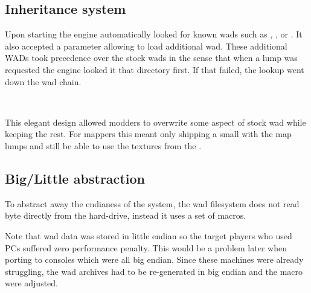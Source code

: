 \subsection{Inheritance system}
Upon starting the engine automatically looked for known wads such as , , or . It also accepted a parameter  allowing to load additional wad. These additional WADs took precedence over the stock wads in the sense that when a lump was requested the engine looked it that directory first. If that failed, the lookup went down the wad chain.\\
\par
{}\\
\par
 This elegant design allowed modders to overwrite some aspect of stock wad while keeping the rest. For mappers this meant only shipping a small  with the map lumps and still be able to use the textures from the .\\
 \par

\subsection{Big/Little abstraction}
To abstract away the endianess of the system, the wad filesystem does not read byte directly from the hard-drive, instead it uses a set of macros.\\
\par
{}
\par
Note that wad data was stored in little endian so the target players who used PCs suffered zero performance penalty. This would be a problem later when porting to consoles which were all big endian. Since these machines were already struggling, the wad archives had to be re-generated in big endian and the macro were adjusted.